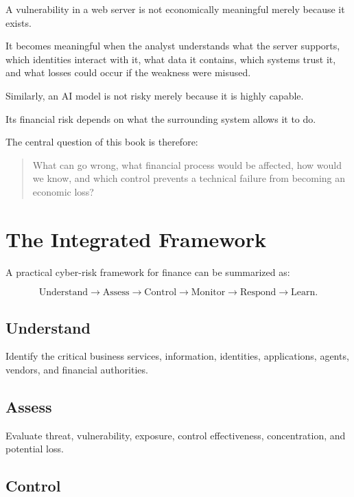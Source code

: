 A vulnerability in a web server is not economically meaningful merely because it exists.

It becomes meaningful when the analyst understands what the server supports, which identities interact with it, what data it contains, which systems trust it, and what losses could occur if the weakness were misused.

Similarly, an AI model is not risky merely because it is highly capable.

Its financial risk depends on what the surrounding system allows it to do.

The central question of this book is therefore:

\begin{quote}
What can go wrong, what financial process would be affected, how would we know, and which control prevents a technical failure from becoming an economic loss?
\end{quote}

\section{The Integrated Framework}

A practical cyber-risk framework for finance can be summarized as:

\begin{equation}
\text{Understand}
\rightarrow
\text{Assess}
\rightarrow
\text{Control}
\rightarrow
\text{Monitor}
\rightarrow
\text{Respond}
\rightarrow
\text{Learn}.
\end{equation}

\subsection{Understand}

Identify the critical business services, information, identities, applications, agents, vendors, and financial authorities.

\subsection{Assess}

Evaluate threat, vulnerability, exposure, control effectiveness, concentration, and potential loss.

\subsection{Control}

